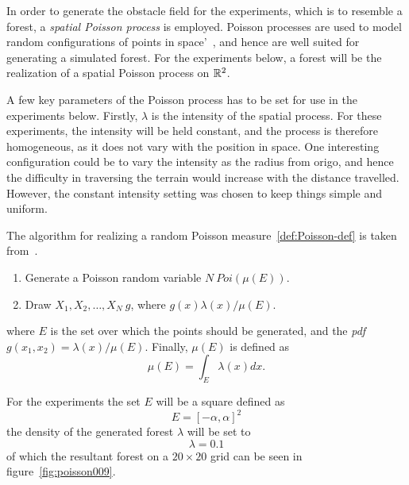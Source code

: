 In order to generate the obstacle field for the experiments, which is to
resemble a forest, a \textit{spatial Poisson process} is employed. Poisson
processes are used to model random configurations of points in
space'~\cite{Kroese_2014}, and hence are well suited for
generating a simulated forest. For the experiments below, a forest will be the
realization of a spatial Poisson process on \(\mathbb{R}^2\).

A few key parameters of the Poisson process has to be set for use in the
experiments below. Firstly, \(\lambda\) is the intensity of the spatial process.
For these experiments, the intensity will be held constant, and the process is
therefore homogeneous, as it does not vary with the position in space. One
interesting configuration could be to vary the intensity as the radius from
origo, and hence the difficulty in traversing the terrain would increase with
the distance travelled. However, the constant intensity setting was chosen to
keep things simple and uniform.

The algorithm for realizing a random Poisson measure~\cref{def:Poisson-def} is
taken from~\cite[Definition 1.1.1,p~34]{Kroese_2014}.

\begin{definition}
  \label{def:Poisson-def}
  \begin{enumerate}
  \item Generate a Poisson random variable \(N ~ Poi(\mu(E))\).
  \item Draw \(X_1,X_2,\ldots,X_N ~ g\), where \(g(x) \lambda(x)/ \mu(E)\).
  \end{enumerate}
\end{definition}
where \(E\) is the set over which the points should be generated, and the
\textit{pdf} \(g(x_1, x_2) = \lambda(x)/\mu(E)\). Finally, \(\mu(E)\) is defined
as
\[
  \mu(E) = \int_{E} \lambda(x) dx.
\]

For the experiments the set \(E\) will be a square defined as
\[
  E = [-\alpha, \alpha]^2
\]
the density of the generated forest \(\lambda\) will be set to
\[
  \lambda = 0.1
\]
of which the resultant forest on a \(20 \times 20\) grid can be seen in
figure~\cref{fig:poisson009}.

